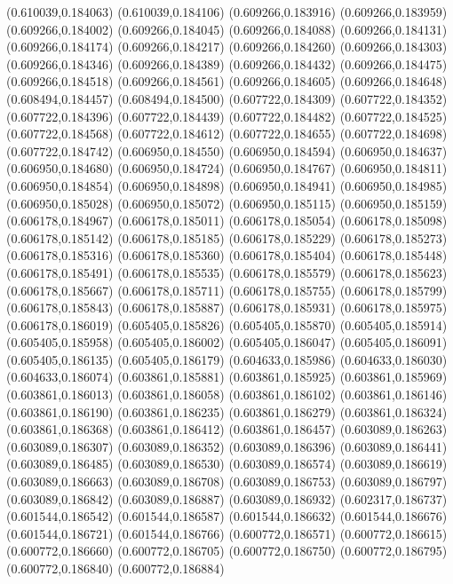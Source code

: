 (0.610039,0.184063)
(0.610039,0.184106)
(0.609266,0.183916)
(0.609266,0.183959)
(0.609266,0.184002)
(0.609266,0.184045)
(0.609266,0.184088)
(0.609266,0.184131)
(0.609266,0.184174)
(0.609266,0.184217)
(0.609266,0.184260)
(0.609266,0.184303)
(0.609266,0.184346)
(0.609266,0.184389)
(0.609266,0.184432)
(0.609266,0.184475)
(0.609266,0.184518)
(0.609266,0.184561)
(0.609266,0.184605)
(0.609266,0.184648)
(0.608494,0.184457)
(0.608494,0.184500)
(0.607722,0.184309)
(0.607722,0.184352)
(0.607722,0.184396)
(0.607722,0.184439)
(0.607722,0.184482)
(0.607722,0.184525)
(0.607722,0.184568)
(0.607722,0.184612)
(0.607722,0.184655)
(0.607722,0.184698)
(0.607722,0.184742)
(0.606950,0.184550)
(0.606950,0.184594)
(0.606950,0.184637)
(0.606950,0.184680)
(0.606950,0.184724)
(0.606950,0.184767)
(0.606950,0.184811)
(0.606950,0.184854)
(0.606950,0.184898)
(0.606950,0.184941)
(0.606950,0.184985)
(0.606950,0.185028)
(0.606950,0.185072)
(0.606950,0.185115)
(0.606950,0.185159)
(0.606178,0.184967)
(0.606178,0.185011)
(0.606178,0.185054)
(0.606178,0.185098)
(0.606178,0.185142)
(0.606178,0.185185)
(0.606178,0.185229)
(0.606178,0.185273)
(0.606178,0.185316)
(0.606178,0.185360)
(0.606178,0.185404)
(0.606178,0.185448)
(0.606178,0.185491)
(0.606178,0.185535)
(0.606178,0.185579)
(0.606178,0.185623)
(0.606178,0.185667)
(0.606178,0.185711)
(0.606178,0.185755)
(0.606178,0.185799)
(0.606178,0.185843)
(0.606178,0.185887)
(0.606178,0.185931)
(0.606178,0.185975)
(0.606178,0.186019)
(0.605405,0.185826)
(0.605405,0.185870)
(0.605405,0.185914)
(0.605405,0.185958)
(0.605405,0.186002)
(0.605405,0.186047)
(0.605405,0.186091)
(0.605405,0.186135)
(0.605405,0.186179)
(0.604633,0.185986)
(0.604633,0.186030)
(0.604633,0.186074)
(0.603861,0.185881)
(0.603861,0.185925)
(0.603861,0.185969)
(0.603861,0.186013)
(0.603861,0.186058)
(0.603861,0.186102)
(0.603861,0.186146)
(0.603861,0.186190)
(0.603861,0.186235)
(0.603861,0.186279)
(0.603861,0.186324)
(0.603861,0.186368)
(0.603861,0.186412)
(0.603861,0.186457)
(0.603089,0.186263)
(0.603089,0.186307)
(0.603089,0.186352)
(0.603089,0.186396)
(0.603089,0.186441)
(0.603089,0.186485)
(0.603089,0.186530)
(0.603089,0.186574)
(0.603089,0.186619)
(0.603089,0.186663)
(0.603089,0.186708)
(0.603089,0.186753)
(0.603089,0.186797)
(0.603089,0.186842)
(0.603089,0.186887)
(0.603089,0.186932)
(0.602317,0.186737)
(0.601544,0.186542)
(0.601544,0.186587)
(0.601544,0.186632)
(0.601544,0.186676)
(0.601544,0.186721)
(0.601544,0.186766)
(0.600772,0.186571)
(0.600772,0.186615)
(0.600772,0.186660)
(0.600772,0.186705)
(0.600772,0.186750)
(0.600772,0.186795)
(0.600772,0.186840)
(0.600772,0.186884)

